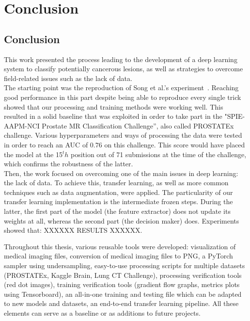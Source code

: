 
\chapter{Conclusion}
\label{ch:conclusions}

\section{Conclusion}
\setlength{\marginparwidth}{3cm}\leavevmode {}This work presented the process leading to the development of a deep learning system to classify potentially cancerous lesions, as well as strategies to overcome field-related issues such as the lack of data.\\
The starting point was the reproduction of Song et al.'s experiment~\cite{07}. Reaching good performance in this part despite being able to reproduce every single trick showed that our processing and training methods were working well. This resulted in a solid baseline that was exploited in order to take part in the "SPIE-AAPM-NCI Prostate MR Classification Challenge”, also called PROSTATEx challenge. Various hyperparameters and ways of processing the data were tested in order to reach an AUC of $0.76$ on this challenge. This score would have placed the model at the 15$^th$ position out of 71 submissions at the time of the challenge, which confirms the robustness of the latter.  \\
Then, the work focused on overcoming one of the main issues in deep learning: the lack of data. To achieve this, transfer learning, as well as more common techniques such as data augmentation, were applied. The particularity of our transfer learning implementation is the intermediate frozen steps. During the latter, the first part of the model (the feature extractor) does not update its weights at all, whereas the second part (the decision maker) does. Experiments showed that: XXXXXX RESULTS XXXXXX.

Throughout this thesis, various reusable tools were developed: visualization of medical imaging files, conversion of medical imaging files to PNG, a PyTorch sampler using undersampling, easy-to-use processing scripts for multiple datasets (PROSTATEx, Kaggle Brain, Lung CT Challenge), processing verification tools (red dot images), training verification tools (gradient flow graphs, metrics plots using Tensorboard), an all-in-one training and testing file which can be adapted to new models and datasets, an end-to-end transfer learning pipeline. All these elements can serve as a baseline or as additions to future projects. 

